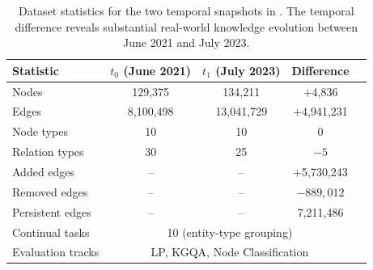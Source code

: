 \begin{table}[t]
\centering
\caption{Dataset statistics for the two temporal snapshots in \ours. The temporal difference reveals substantial real-world knowledge evolution between June 2021 and July 2023.}
\label{tab:dataset_stats}
\small
\begin{tabular}{lcccc}
\toprule
\textbf{Statistic} & \textbf{$t_0$ (June 2021)} & \textbf{$t_1$ (July 2023)} & \textbf{Difference} \\
\midrule
Nodes & 129,375 & 134,211 & +4,836 \\
Edges & 8,100,498 & 13,041,729 & +4,941,231 \\
Node types & 10 & 10 & 0 \\
Relation types & 30 & 25 & $-5$ \\
\midrule
Added edges & -- & -- & +5,730,243 \\
Removed edges & -- & -- & $-889,012$ \\
Persistent edges & -- & -- & 7,211,486 \\
\midrule
Continual tasks & \multicolumn{3}{c}{10 (entity-type grouping)} \\
Evaluation tracks & \multicolumn{3}{c}{LP, KGQA, Node Classification} \\
\bottomrule
\end{tabular}
\end{table}
